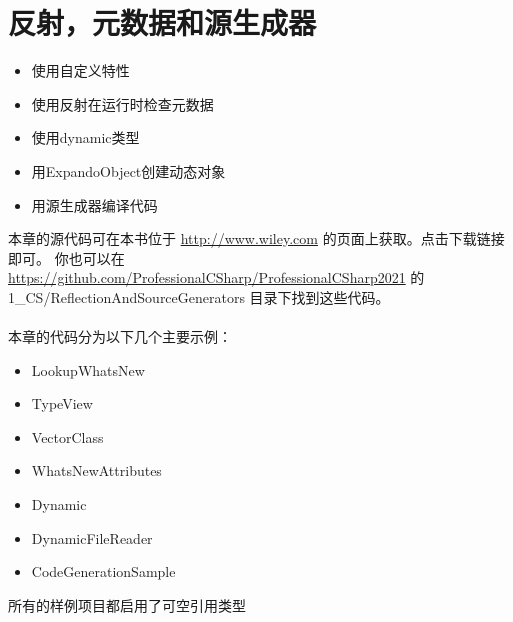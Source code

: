 \chapter{反射，元数据和源生成器}
\underline{}

\begin{itemize}
    \item 使用自定义特性
    \item 使用反射在运行时检查元数据
    \item 使用dynamic类型
    \item 用ExpandoObject创建动态对象
    \item 用源生成器编译代码
\end{itemize}
\medskip
\underline{}

本章的源代码可在本书位于 \url{http://www.wiley.com} 的页面上获取。点击下载链接即可。
你也可以在 \url{https://github.com/ProfessionalCSharp/ProfessionalCSharp2021} 的 1\_CS/ReflectionAndSourceGenerators 目录下找到这些代码。
\\ \\
本章的代码分为以下几个主要示例：
\begin{itemize}
    \item LookupWhatsNew
    \item TypeView
    \item VectorClass
    \item WhatsNewAttributes
    \item Dynamic
    \item DynamicFileReader
    \item CodeGenerationSample
\end{itemize}
所有的样例项目都启用了可空引用类型

